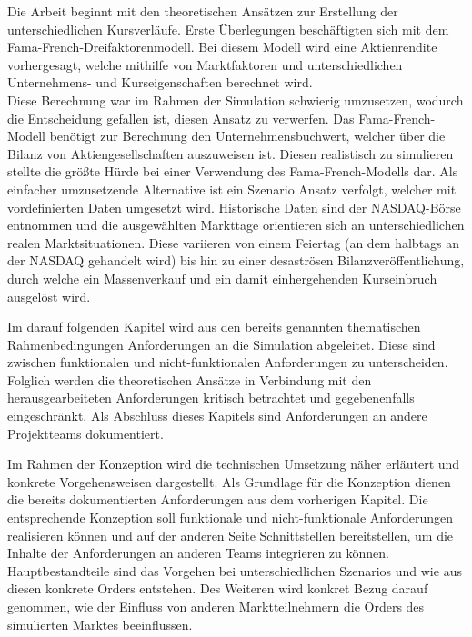 	
	Die Arbeit beginnt mit den theoretischen Ansätzen zur Erstellung der unterschiedlichen Kursverläufe. Erste Überlegungen beschäftigten sich mit dem Fama-French-Dreifaktorenmodell. Bei diesem Modell wird eine Aktienrendite vorhergesagt, welche mithilfe von Marktfaktoren und unterschiedlichen Unternehmens- und Kurseigenschaften berechnet wird.\\
	Diese Berechnung war im Rahmen der Simulation schwierig umzusetzen, wodurch die Entscheidung gefallen ist, diesen Ansatz zu verwerfen. Das Fama-French-Modell benötigt zur Berechnung den Unternehmensbuchwert, welcher über die Bilanz von Aktiengesellschaften auszuweisen ist. Diesen realistisch zu simulieren stellte die größte Hürde bei einer Verwendung des Fama-French-Modells dar. Als einfacher umzusetzende Alternative ist ein Szenario Ansatz verfolgt, welcher mit vordefinierten Daten umgesetzt wird. Historische Daten sind der NASDAQ-Börse entnommen und die ausgewählten Markttage orientieren sich an unterschiedlichen realen Marktsituationen. Diese variieren von einem Feiertag (an dem halbtags an der NASDAQ gehandelt wird) bis hin zu einer desaströsen Bilanzveröffentlichung, durch welche ein Massenverkauf und ein damit einhergehenden Kurseinbruch ausgelöst wird.
	
	
	Im darauf folgenden Kapitel wird aus den bereits genannten thematischen Rahmenbedingungen Anforderungen an die Simulation abgeleitet. Diese sind zwischen funktionalen und nicht-funktionalen Anforderungen zu unterscheiden. Folglich werden die theoretischen Ansätze in Verbindung mit den herausgearbeiteten Anforderungen kritisch betrachtet und gegebenenfalls eingeschränkt. Als Abschluss dieses Kapitels sind Anforderungen an andere Projektteams dokumentiert.
	
	
	Im Rahmen der Konzeption wird die technischen Umsetzung näher erläutert und konkrete Vorgehensweisen dargestellt. Als Grundlage für die Konzeption dienen die bereits dokumentierten Anforderungen aus dem vorherigen Kapitel. Die entsprechende Konzeption soll funktionale und nicht-funktionale Anforderungen realisieren können und auf der anderen Seite Schnittstellen bereitstellen, um die Inhalte der Anforderungen an anderen Teams integrieren zu können. Hauptbestandteile sind das Vorgehen bei unterschiedlichen Szenarios und wie aus diesen konkrete Orders entstehen. Des Weiteren wird konkret Bezug darauf genommen, wie der Einfluss von anderen Marktteilnehmern die Orders des simulierten Marktes beeinflussen.
	
